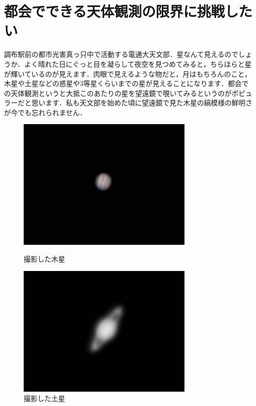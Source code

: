 \documentclass[supernova_2023]{subfiles}
\begin{document}
\section{都会でできる天体観測の限界に挑戦したい}
調布駅前の都市光害真っ只中で活動する電通大天文部．星なんて見えるのでしょうか．よく晴れた日にぐっと目を凝らして夜空を見つめてみると，ちらほらと星が輝いているのが見えます．肉眼で見えるような物だと，月はもちろんのこと，木星や土星などの惑星や3等星くらいまでの星が見えることになります．都会での天体観測というと大抵このあたりの星を望遠鏡で覗いてみるというのがポピュラーだと思います．私も天文部を始めた頃に望遠鏡で見た木星の縞模様の鮮明さが今でも忘れられません．
\begin{figure}[H]
  \centering
  \begin{minipage}{0.4\columnwidth}
    \centering
    \includegraphics[width=\columnwidth]{figures/Yosuke/Jupiter.jpg}
    \caption{撮影した木星}
    \label{fig:jupiter}
  \end{minipage}
  \begin{minipage}{0.4\columnwidth}
    \centering
    \includegraphics[width=\columnwidth]{figures/Yosuke/Saturn.jpg}
    \caption{撮影した土星}
    \label{fig:saturn}
  \end{minipage}
\end{figure}
\end{document}
